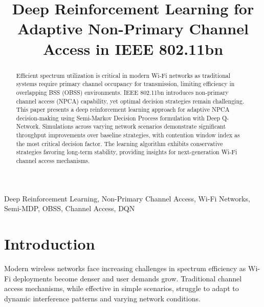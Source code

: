 \documentclass[conference]{IEEEtran}
\begin{document}
\title{Deep Reinforcement Learning for Adaptive Non-Primary Channel Access in IEEE 802.11bn}

\author{
}

\maketitle

\begin{abstract}
Efficient spectrum utilization is critical in modern Wi-Fi networks as traditional systems require primary channel occupancy for transmission, limiting efficiency in overlapping BSS (OBSS) environments. IEEE 802.11bn introduces non-primary channel access (NPCA) capability, yet optimal decision strategies remain challenging. This paper presents a deep reinforcement learning approach for adaptive NPCA decision-making using Semi-Markov Decision Process formulation with Deep Q-Network. Simulations across varying network scenarios demonstrate significant throughput improvements over baseline strategies, with contention window index as the most critical decision factor. The learning algorithm exhibits conservative strategies favoring long-term stability, providing insights for next-generation Wi-Fi channel access mechanisms.
\end{abstract}

\begin{IEEEkeywords}
Deep Reinforcement Learning, Non-Primary Channel Access, Wi-Fi Networks, Semi-MDP, OBSS, Channel Access, DQN
\end{IEEEkeywords}

\section{Introduction}

Modern wireless networks face increasing challenges in spectrum efficiency as Wi-Fi deployments become denser and user demands grow. Traditional channel access mechanisms, while effective in simple scenarios, struggle to adapt to dynamic interference patterns and varying network conditions.
\end{document}
